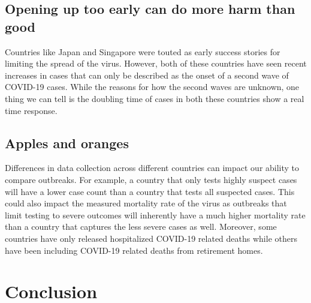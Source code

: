 \documentclass[alpha-refs]{wiley-article}
\begin{document}
\subsection{Opening up too early can do more harm than good}
Countries like Japan and Singapore were touted as early success stories for limiting the spread of the virus. 
However, both of these countries have seen recent increases in cases that can only be described as the onset of a second wave of COVID-19 cases.
While the reasons for how the second waves are unknown, one thing we can tell is the doubling time of cases in both these countries show a real time response.

\subsection{Apples and oranges}
Differences in data collection across different countries can impact our ability to compare outbreaks.
For example, a country that only tests highly suspect cases will have a lower case count than a country that tests all suspected cases.
This could also impact the measured mortality rate of the virus as outbreaks that limit testing to severe outcomes will inherently have a much higher mortality rate than a country that captures the less severe cases as well.
Moreover, some countries have only released hospitalized COVID-19 related deaths while others have been including COVID-19 related deaths from retirement homes.



\section{Conclusion}
\end{document}
